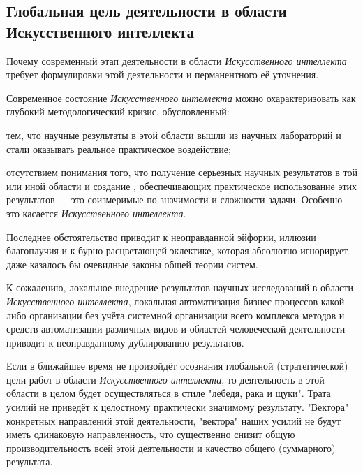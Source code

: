 \subsection*{Глобальная цель деятельности в области Искусственного интеллекта}
Почему современный этап деятельности в области \textit{Искусственного интеллекта} требует формулировки   этой деятельности и перманентного её уточнения.

Современное состояние \textit{Искусственного интеллекта} можно охарактеризовать как глубокий методологический кризис, обусловленный:
\begin{textitemize}
	\item тем, что научные результаты в этой области вышли из научных лабораторий и стали оказывать реальное практическое воздействие;
	\item отсутствием понимания того, что получение серьезных научных результатов в той или иной области и создание , обеспечивающих  практическое использование этих результатов --- это соизмеримые по значимости и сложности задачи. Особенно это касается \textit{Искусственного интеллекта}.
\end{textitemize}

Последнее обстоятельство приводит к неоправданной эйфории, иллюзии благоплучия и к бурно расцветающей эклектике, которая абсолютно игнорирует даже казалось бы очевидные законы общей теории систем.

К сожалению, локальное внедрение результатов научных исследований в области \textit{Искусственного интеллекта}, локальная автоматизация бизнес-процессов какой-либо организации без учёта системной организации всего комплекса методов и средств автоматизации различных видов и областей человеческой деятельности приводит к неоправданному дублированию результатов. 

Если в ближайшее время не произойдёт осознания глобальной (стратегической) цели работ в области \textit{Искусственного интеллекта}, то деятельность в этой области в целом будет осуществляться в стиле "лебедя, рака и щуки"{}. Трата усилий не приведёт к целостному практически значимому результату. "Вектора"{} конкретных направлений этой деятельности, "вектора"{} наших усилий не будут иметь одинаковую направленность, что существенно снизит общую  производительность всей этой деятельности и качество общего (суммарного) результата.

